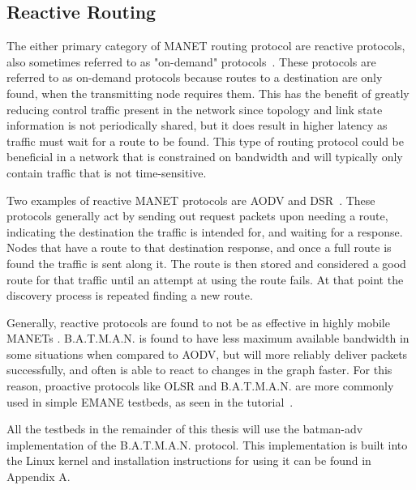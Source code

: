 \subsection{Reactive Routing}
The either primary category of MANET routing protocol are reactive protocols, also sometimes referred to as "on-demand" protocols~\cite{manet_survey}.
These protocols are referred to as on-demand protocols because routes to a destination are only found, when the transmitting node requires them.
This has the benefit of greatly reducing control traffic present in the network since topology and link state information is not periodically shared, but it does result in higher latency as traffic must wait for a route to be found.
This type of routing protocol could be beneficial in a network that is constrained on bandwidth and will typically only contain traffic that is not time-sensitive.\par
Two examples of reactive MANET protocols are AODV and DSR~\cite{reactive_routing}.
These protocols generally act by sending out request packets upon needing a route, indicating the destination the traffic is intended for, and waiting for a response.
Nodes that have a route to that destination response, and once a full route is found the traffic is sent along it.
The route is then stored and considered a good route for that traffic until an attempt at using the route fails.
At that point the discovery process is repeated finding a new route.\par
Generally, reactive protocols are found to not be as effective in highly mobile MANETs \cite{aodv_batman,reactive_routing}.
B.A.T.M.A.N. is found to have less maximum available bandwidth in some situations when compared to AODV, but will more reliably deliver packets successfully, and often is able to react to changes in the graph faster.
For this reason, proactive protocols like OLSR and B.A.T.M.A.N. are more commonly used in simple EMANE testbeds, as seen in the tutorial~\cite{emane_tutorial}.\par
All the testbeds in the remainder of this thesis will use the batman-adv implementation of the B.A.T.M.A.N. protocol.
This implementation is built into the Linux kernel and installation instructions for using it can be found in Appendix A. %

